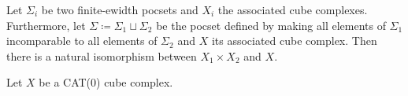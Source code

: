 \begin{cor}
  Let \(\Sigma_i\) be two finite-ewidth pocsets and \(X_i\) the associated cube complexes. Furthermore, let \(\Sigma \coloneqq \Sigma_1 \sqcup \Sigma_2\) be the pocset defined by making all elements of \(\Sigma_1\) incomparable to all elements of \(\Sigma_2\) and \(X\) its associated cube complex. Then there is a natural isomorphism between \(X_1 \times X_2\) and \(X\).
\end{cor}

\begin{cor}
  Let \(X\) be a CAT(0) cube complex. 
\end{cor}

